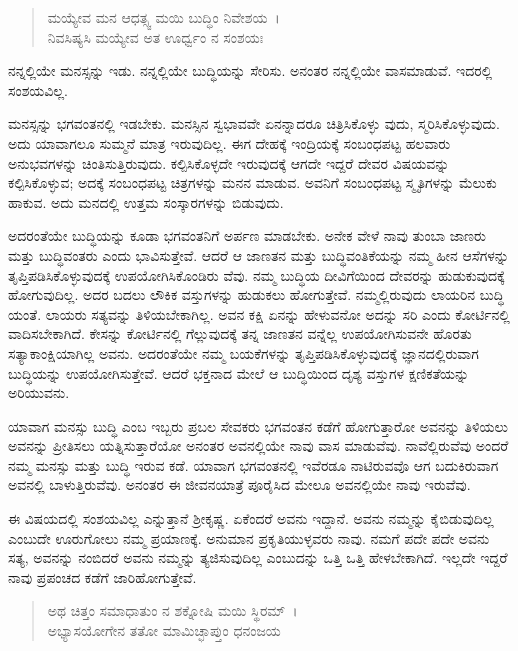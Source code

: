 \begin{verse}
ಮಯ್ಯೇವ ಮನ ಆಧತ್ಸ್ವ ಮಯಿ ಬುದ್ಧಿಂ ನಿವೇಶಯ~।\\ನಿವಸಿಷ್ಯಸಿ ಮಯ್ಯೇವ ಅತ ಊರ್ಧ್ವಂ ನ ಸಂಶಯಃ 
\end{verse}

{\small ನನ್ನಲ್ಲಿಯೇ ಮನಸ್ಸನ್ನು ಇಡು. ನನ್ನಲ್ಲಿಯೇ ಬುದ್ಧಿಯನ್ನು ಸೇರಿಸು. ಅನಂತರ ನನ್ನಲ್ಲಿಯೇ ವಾಸಮಾಡುವೆ. ಇದರಲ್ಲಿ ಸಂಶಯವಿಲ್ಲ.}

ಮನಸ್ಸನ್ನು ಭಗವಂತನಲ್ಲಿ ಇಡಬೇಕು. ಮನಸ್ಸಿನ ಸ್ವಭಾವವೇ ಏನನ್ನಾದರೂ ಚಿತ್ರಿಸಿಕೊಳ್ಳು ವುದು, ಸ್ಮರಿಸಿಕೊಳ್ಳುವುದು. ಅದು ಯಾವಾಗಲೂ ಸುಮ್ಮನೆ ಮಾತ್ರ ಇರುವುದಿಲ್ಲ. ಈಗ ದೇಹಕ್ಕೆ ಇಂದ್ರಿಯಕ್ಕೆ ಸಂಬಂಧಪಟ್ಟ ಹಲವಾರು ಅನುಭವಗಳನ್ನು ಚಿಂತಿಸುತ್ತಿರುವುದು. ಕಲ್ಪಿಸಿಕೊಳ್ಳದೇ ಇರುವುದಕ್ಕೆ ಆಗದೇ ಇದ್ದರೆ ದೇವರ ವಿಷಯವನ್ನು ಕಲ್ಪಿಸಿಕೊಳ್ಳುವ; ಅದಕ್ಕೆ ಸಂಬಂಧಪಟ್ಟ ಚಿತ್ರಗಳನ್ನು ಮನನ ಮಾಡುವ. ಅವನಿಗೆ ಸಂಬಂಧಪಟ್ಟ ಸ್ಮೃತಿಗಳನ್ನು ಮೆಲುಕು ಹಾಕುವ. ಅದು ಮನದಲ್ಲಿ ಉತ್ತಮ ಸಂಸ್ಕಾರಗಳನ್ನು ಬಿಡುವುದು.

ಅದರಂತೆಯೇ ಬುದ್ಧಿಯನ್ನು ಕೂಡಾ ಭಗವಂತನಿಗೆ ಅರ್ಪಣ ಮಾಡಬೇಕು. ಅನೇಕ ವೇಳೆ ನಾವು ತುಂಬಾ ಜಾಣರು ಮತ್ತು ಬುದ್ಧಿವಂತರು ಎಂದು ಭಾವಿಸುತ್ತೇವೆ. ಆದರೆ ಆ ಜಾಣತನ ಮತ್ತು ಬುದ್ಧಿವಂತಿಕೆಯನ್ನು ನಮ್ಮ ಹೀನ ಆಸೆಗಳನ್ನು ತೃಪ್ತಿಪಡಿಸಿಕೊಳ್ಳುವುದಕ್ಕೆ ಉಪಯೋಗಿಸಿಕೊಂಡಿರು ವೆವು. ನಮ್ಮ ಬುದ್ಧಿಯ ದೀವಿಗೆಯಿಂದ ದೇವರನ್ನು ಹುಡುಕುವುದಕ್ಕೆ ಹೋಗುವುದಿಲ್ಲ. ಅದರ ಬದಲು ಲೌಕಿಕ ವಸ್ತುಗಳನ್ನು ಹುಡುಕಲು ಹೋಗುತ್ತೇವೆ. ನಮ್ಮಲ್ಲಿರುವುದು ಲಾಯರಿನ ಬುದ್ಧಿ ಯಂತೆ. ಲಾಯರು ಸತ್ಯವನ್ನು ತಿಳಿಯಬೇಕಾಗಿಲ್ಲ. ಅವನ ಕಕ್ಷಿ ಏನನ್ನು ಹೇಳುವನೋ ಅದನ್ನು ಸರಿ ಎಂದು ಕೋರ್ಟಿನಲ್ಲಿ ವಾದಿಸಬೇಕಾಗಿದೆ. ಕೇಸನ್ನು ಕೋರ್ಟಿನಲ್ಲಿ ಗೆಲ್ಲುವುದಕ್ಕೆ ತನ್ನ ಜಾಣತನ ವನ್ನೆಲ್ಲ ಉಪಯೋಗಿಸುವನೇ ಹೊರತು ಸತ್ಯಾಕಾಂಕ್ಷಿಯಾಗಿಲ್ಲ ಅವನು. ಅದರಂತೆಯೇ ನಮ್ಮ ಬಯಕೆಗಳನ್ನು ತೃಪ್ತಿಪಡಿಸಿಕೊಳ್ಳುವುದಕ್ಕೆ ಜ್ಞಾನದಲ್ಲಿರುವಾಗ ಬುದ್ಧಿಯನ್ನು ಉಪಯೋಗಿಸುತ್ತೇವೆ. ಆದರೆ ಭಕ್ತನಾದ ಮೇಲೆ ಆ ಬುದ್ಧಿಯಿಂದ ದೃಶ್ಯ ವಸ್ತುಗಳ ಕ್ಷಣಿಕತೆಯನ್ನು ಅರಿಯುವನು.

ಯಾವಾಗ ಮನಸ್ಸು ಬುದ್ಧಿ ಎಂಬ ಇಬ್ಬರು ಪ್ರಬಲ ಸೇವಕರು ಭಗವಂತನ ಕಡೆಗೆ ಹೋಗುತ್ತಾರೋ ಅವನನ್ನು ತಿಳಿಯಲು ಅವನನ್ನು ಪ್ರೀತಿಸಲು ಯತ್ನಿಸುತ್ತಾರೆಯೋ ಅನಂತರ ಅವನಲ್ಲಿಯೇ ನಾವು ವಾಸ ಮಾಡುವೆವು. ನಾವೆಲ್ಲಿರುವೆವು ಅಂದರೆ ನಮ್ಮ ಮನಸ್ಸು ಮತ್ತು ಬುದ್ಧಿ ಇರುವ ಕಡೆ. ಯಾವಾಗ ಭಗವಂತನಲ್ಲಿ ಇವೆರಡೂ ನಾಟಿರುವವೊ ಆಗ ಬದುಕಿರುವಾಗ ಅವನಲ್ಲಿ ಬಾಳುತ್ತಿರುವೆವು. ಅನಂತರ ಈ ಜೀವನಯಾತ್ರೆ ಪೂರೈಸಿದ ಮೇಲೂ ಅವನಲ್ಲಿಯೇ ನಾವು ಇರುವೆವು.

ಈ ವಿಷಯದಲ್ಲಿ ಸಂಶಯವಿಲ್ಲ ಎನ್ನುತ್ತಾನೆ ಶ‍್ರೀಕೃಷ್ಣ. ಏಕೆಂದರೆ ಅವನು ಇದ್ದಾನೆ. ಅವನು ನಮ್ಮನ್ನು ಕೈಬಿಡುವುದಿಲ್ಲ ಎಂಬುದೇ ಊರುಗೋಲು ನಮ್ಮ ಪ್ರಯಾಣಕ್ಕೆ. ಅನುಮಾನ ಪ್ರಕೃತಿಯುಳ್ಳವರು ನಾವು. ನಮಗೆ ಪದೇ ಪದೇ ಅವನು ಸತ್ಯ, ಅವನನ್ನು ನಂಬಿದರೆ ಅವನು ನಮ್ಮನ್ನು ತ್ಯಜಿಸುವುದಿಲ್ಲ ಎಂಬುದನ್ನು ಒತ್ತಿ ಒತ್ತಿ ಹೇಳಬೇಕಾಗಿದೆ. ಇಲ್ಲದೇ ಇದ್ದರೆ ನಾವು ಪ್ರಪಂಚದ ಕಡೆಗೆ ಜಾರಿಹೋಗುತ್ತೇವೆ.

\begin{verse}
ಅಥ ಚಿತ್ತಂ ಸಮಾಧಾತುಂ ನ ಶಕ್ನೋಷಿ ಮಯಿ ಸ್ಥಿರಮ್~।\\ಅಭ್ಯಾಸಯೋಗೇನ ತತೋ ಮಾಮಿಚ್ಛಾಪ್ತುಂ ಧನಂಜಯ 
\end{verse}

